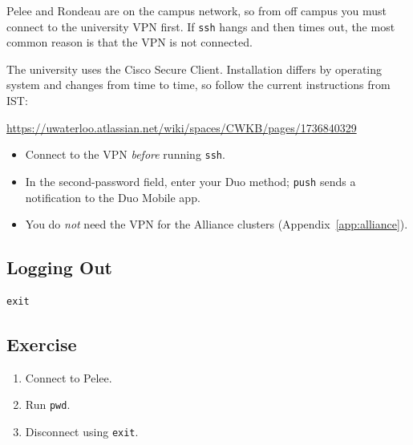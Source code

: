 Pelee and Rondeau are on the campus network, so from off campus you must connect to the
university VPN first. If \texttt{ssh} hangs and then times out, the most common reason is that the
VPN is not connected.

The university uses the Cisco Secure Client. Installation differs by operating system and changes
from time to time, so follow the current instructions from IST:

\begin{center}
\url{https://uwaterloo.atlassian.net/wiki/spaces/CWKB/pages/1736840329}
\end{center}

\begin{itemize}
\item Connect to the VPN \emph{before} running \texttt{ssh}.
\item In the second-password field, enter your Duo method; \texttt{push} sends a notification to
the Duo Mobile app.
\item You do \emph{not} need the VPN for the Alliance clusters (Appendix~\ref{app:alliance}).
\end{itemize}

\subsection{Logging Out}

\begin{lstlisting}
exit
\end{lstlisting}

\subsection{Exercise}

\begin{enumerate}
\item Connect to Pelee.
\item Run \texttt{pwd}.
\item Disconnect using \texttt{exit}.
\end{enumerate}
